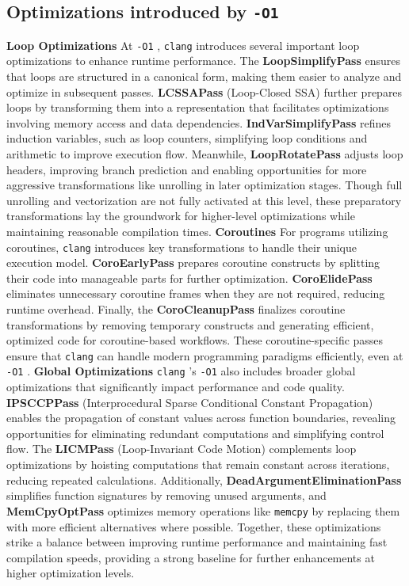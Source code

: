 \documentclass{rapport}
\newcommand{\clang}{\texttt{clang} }
\newcommand{\optione}{\texttt{-O1} }
\begin{document}
\subsection*{Optimizations introduced by \optione}
\textbf{Loop Optimizations} \newline
At \optione, \clang introduces several important loop optimizations to enhance runtime performance. The \textbf{LoopSimplifyPass} ensures that loops are structured 
in a canonical form, making them easier to analyze and optimize in subsequent passes. \textbf{LCSSAPass} (Loop-Closed SSA) further prepares loops by transforming 
them into a representation that facilitates optimizations involving memory access and data dependencies. \textbf{IndVarSimplifyPass} refines induction variables,
such as loop counters, simplifying loop conditions and arithmetic to improve execution flow. 
Meanwhile, \textbf{LoopRotatePass} adjusts loop headers, improving branch prediction and enabling opportunities for more aggressive transformations like unrolling
in later optimization stages. 
Though full unrolling and vectorization are not fully activated at this level, these preparatory transformations lay the groundwork for higher-level optimizations while maintaining reasonable compilation times.
\newline\newline
\textbf{Coroutines}\newline
For programs utilizing coroutines, \clang introduces key transformations to handle their unique execution model. 
\textbf{CoroEarlyPass} prepares coroutine constructs by splitting their code into manageable parts for further optimization. 
\textbf{CoroElidePass} eliminates unnecessary coroutine frames when they are not required, reducing runtime overhead. 
Finally, the \textbf{CoroCleanupPass} finalizes coroutine transformations by removing temporary constructs and generating efficient, optimized code for 
coroutine-based workflows. These coroutine-specific passes ensure that \clang can handle modern programming paradigms efficiently, even at \optione.
\newline\newline
\textbf{Global Optimizations}\newline
\clang’s \optione also includes broader global optimizations that significantly impact performance and code quality. \textbf{IPSCCPPass} (Interprocedural Sparse Conditional Constant Propagation) 
enables the propagation of constant values across function boundaries, revealing opportunities for eliminating redundant computations and simplifying control flow. 
The \textbf{LICMPass} (Loop-Invariant Code Motion) complements loop optimizations by hoisting computations that remain constant across iterations, reducing repeated calculations. 
Additionally, \textbf{DeadArgumentEliminationPass} simplifies function signatures by removing unused arguments, and \textbf{MemCpyOptPass} optimizes memory operations like \texttt{memcpy} 
by replacing them with more efficient alternatives where possible. Together, these optimizations strike a balance between improving runtime performance and maintaining fast compilation 
speeds, providing a strong baseline for further enhancements at higher optimization levels.
\end{document}
